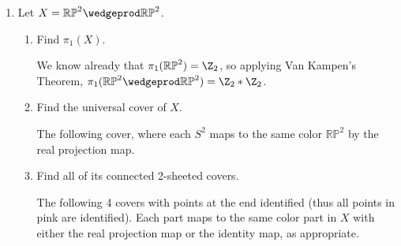 \documentclass[12pt,letterpaper]{article}
\newcommand{\RP}{\mathbb{RP}}
\renewcommand{\phi}{\varphi}
\begin{document}
\begin{enumerate}
\begin{theorem*}
If $f:(X,x_0)\to (Y,y_0)$ is a homotopy equivalence, then $f_*:\pi_1(X,x_0)\to\pi_1(Y,y_0)$ is a group isomorphism. 
\end{theorem*}
\begin{proof}
Let $g$ be the homotopy inverse for $f$, so $f\circ g\simeq	\id$ and $g\circ f\simeq \id$. We will show that the induced maps are inverse homomorphisms. Observe that $f_*g_*=(fg)_*$ since for any loop $\gamma$ in $(Y,y_0)$
$$[\gamma]\xmapsto{\quad\;\,\,(fg)_*\quad\;\,\,} [fg(\gamma)]$$
$$[\gamma]\overset{g_*}{\mapsto}[g(\gamma)]\overset{f_*}{\mapsto}[fg(\gamma)]$$
and since both $f,g$ preserve basepoints, then $fg$ and $\id$ both fix their basepoint. Since $fg\simeq\id$, so there is a homotopy $\phi_t$ exhibiting $fg\simeq\id$ which fixes the basepoint for all time. Thus composing with $\gamma$ yields $\phi_t(\gamma)$ which is a loop homotopy exhibiting $fg(\gamma)\simeq \gamma$. Thus
$$[fg(\gamma)]=[\gamma],$$
and so $f_*g_*[\gamma]=[\gamma]$, so $f_*g_*=\id$. 

The same argument shows that $g_*f_*=\id$, and so $f_*$ and $g_*$ are group isomorphisms. 
\end{proof}

\pagebreak
\item Let $X=\RP^2\wedgeprod\RP^2$.
	\begin{enumerate}[label=(\alph*)]
	\item Find $\pi_1(X)$. 
	
	\answer	We know already that $\pi_1(\RP^2)=\Z_2$, so applying Van Kampen's Theorem, $\pi_1(\RP^2\wedgeprod\RP^2)=\Z_2*\Z_2$. 
	
	\item Find the universal cover of $X$. 
	
	\answer The following cover, where each $S^2$ maps to the same color $\RP^2$ by the real projection map. 
	
	
	\item Find all of its connected 2-sheeted covers.
	
	\answer The following 4 covers with points at the end identified (thus all points in pink are identified). Each part maps to the same color part in $X$ with either the real projection map or the identity map, as appropriate. 
	
	\end{enumerate}


\end{enumerate}
\end{document}
